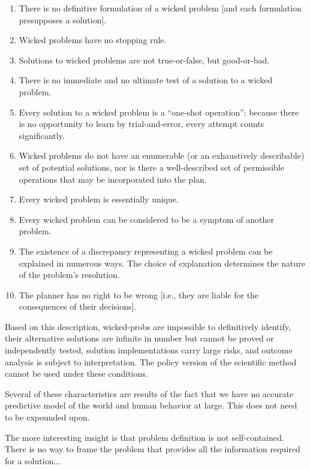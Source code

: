 \begin{displayquote}
  \begin{enumerate}
    \item There is no definitive formulation of a wicked problem [and each formulation presupposes a solution].
    \item Wicked problems have no stopping rule.
    \item Solutions to wicked problems are not true-or-false, but good-or-bad.
    \item There is no immediate and no ultimate test of a solution to a wicked problem.
    \item Every solution to a wicked problem is a ``one-shot operation''; because there is no opportunity to learn by
          trial-and-error, every attempt counts significantly.
    \item Wicked problems do not have an enumerable (or an exhaustively describable) set of potential solutions, nor is
          there a well-described set of permissible operations that may be incorporated into the plan.
    \item Every wicked problem is essentially unique.
    \item Every wicked problem can be considered to be a symptom of another problem.
    \item The existence of a discrepancy representing a wicked problem can be explained in numerous ways. The choice of
          explanation determines the nature of the problem's resolution.
    \item The planner has no right to be wrong [i.e., they are liable for the consequences of their decisions].
  \end{enumerate}
\end{displayquote}

Based on this description, \acp{wicked-prob} are impossible to definitively identify, their alternative solutions are
infinite in number but cannot be proved or independently tested, solution implementations carry large risks, and outcome
analysis is subject to interpretation. The policy version of the scientific method cannot be used under these
conditions.

Several of these characteristics are results of the fact that we have no accurate predictive model of the world and
human behavior at large. This does not need to be expounded upon.

The more interesting insight is that problem definition is not self-contained. There is no way to frame the problem that
provides all the information required for a solution...

